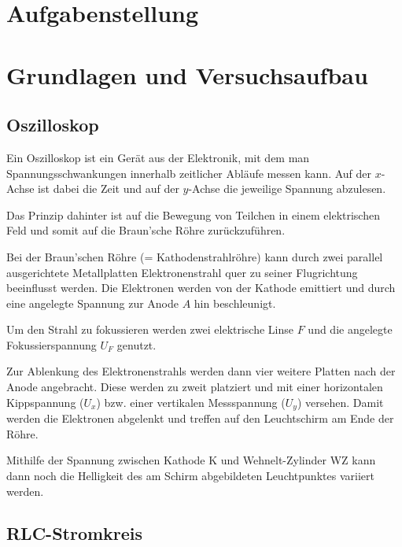 \documentclass{article}
\begin{document}
\parindent0cm




\pagestyle{fancy}

\section{Aufgabenstellung}


\section{Grundlagen und Versuchsaufbau}

\subsection{Oszilloskop}

Ein Oszilloskop ist ein Gerät aus der Elektronik, mit dem man Spannungsschwankungen innerhalb zeitlicher Abläufe messen kann. Auf der $x$-Achse ist dabei die Zeit und auf der $y$-Achse die jeweilige Spannung abzulesen.

Das Prinzip dahinter ist auf die Bewegung von Teilchen in einem elektrischen Feld und somit auf die Braun'sche Röhre zurückzuführen.

Bei der Braun'schen Röhre (= Kathodenstrahlröhre) kann durch zwei parallel ausgerichtete Metallplatten Elektronenstrahl quer zu seiner Flugrichtung beeinflusst werden. Die Elektronen werden von der Kathode emittiert und durch eine angelegte Spannung zur Anode $A$ hin beschleunigt.

Um den Strahl zu fokussieren werden zwei elektrische Linse $F$ und die angelegte Fokussierspannung $U_F$ genutzt.


Zur Ablenkung des Elektronenstrahls werden dann vier weitere Platten nach der Anode angebracht. Diese werden zu zweit platziert und mit einer horizontalen Kippspannung ($U_x$) bzw. einer vertikalen Messspannung ($U_y$) versehen. Damit werden die Elektronen abgelenkt und treffen auf den Leuchtschirm am Ende der Röhre.

Mithilfe der Spannung zwischen Kathode K und Wehnelt-Zylinder WZ kann dann noch die Helligkeit des am Schirm abgebildeten Leuchtpunktes variiert werden. \cite{braun} \cite{uniunterlagen}

\subsection{RLC-Stromkreis}
\end{document}
